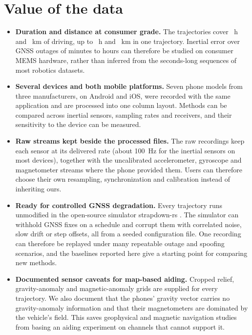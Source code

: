 \section*{Value of the data}
\label{sec:value}

\begin{itemize}
\item \textbf{Duration and distance at consumer grade.} The \numTrajectories{} trajectories cover \numTotalHours~h and \numTotalKm~km of driving, up to \numMaxHours~h and \numMaxKm~km in one trajectory. Inertial error over GNSS outages of minutes to hours can therefore be studied on consumer MEMS hardware, rather than inferred from the seconds-long sequences of most robotics datasets.
\item \textbf{Several devices and both mobile platforms.} Seven phone models from three manufacturers, on Android and iOS, were recorded with the same application and are processed into one column layout. Methods can be compared across inertial sensors, sampling rates and receivers, and their sensitivity to the device can be measured.
\item \textbf{Raw streams kept beside the processed files.} The raw recordings keep each sensor at its delivered rate (about 100~Hz for the inertial sensors on most devices), together with the uncalibrated accelerometer, gyroscope and magnetometer streams where the phone provided them. Users can therefore choose their own resampling, synchronization and calibration instead of inheriting ours.
\item \textbf{Ready for controlled GNSS degradation.} Every trajectory runs unmodified in the open-source simulator strapdown-rs \citep{strapdown-rs}. The simulator can withhold GNSS fixes on a schedule and corrupt them with correlated noise, slow drift or step offsets, all from a seeded configuration file. One recording can therefore be replayed under many repeatable outage and spoofing scenarios, and the baselines reported here give a starting point for comparing new methods.
\item \textbf{Documented sensor caveats for map-based aiding.} Cropped relief, gravity-anomaly and magnetic-anomaly grids are supplied for every trajectory. We also document that the phones' gravity vector carries no gravity-anomaly information and that their magnetometers are dominated by the vehicle's field. This saves geophysical and magnetic navigation studies from basing an aiding experiment on channels that cannot support it.
\end{itemize}
